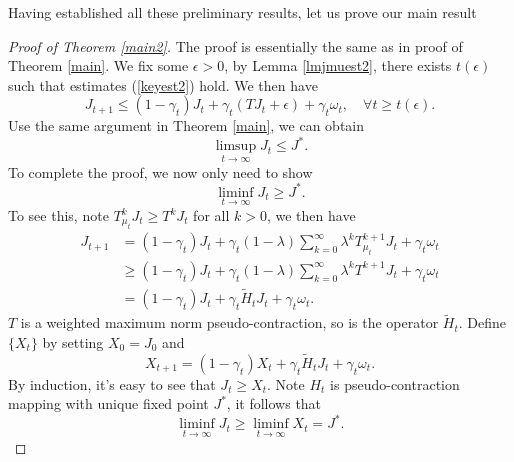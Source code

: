 \documentclass[12pt,a4paper]{amsart}
\numberwithin{equation}{section}
\theoremstyle{plain}
\theoremstyle{definition}
\begin{document}
Having established all these preliminary results, let us prove our main result 
\begin{proof}[Proof of Theorem \ref{main2}]
	The proof is essentially the same as in proof of Theorem \ref{main}. We fix some $\epsilon > 0$, by Lemma \ref{lmjmuest2}, there exists $t(\epsilon)$ such that estimates (\ref{keyest2}) hold. We then have
	$$
	J_{t+ 1} \le (1-\gamma_t)J_t + \gamma_t(TJ_t + \epsilon)  + \gamma_t \omega_t,  \quad \forall t \ge t(\epsilon).
	$$
	Use the same argument in Theorem \ref{main}, we can obtain 
	$$
	\limsup_{t  \to \infty} J_t \le J^{*}.
	$$
	To complete the proof, we now only need to show
	\begin{equation}
	\liminf_{t \to \infty} J_t \ge J^{*}.
	\end{equation}
	To see this, note $T_{\mu_t}^k J_t \ge T^k J_t$ for all $k > 0$, we then have
	$$
	\begin{aligned}
	J_{t+1} & = (1-\gamma_t) J_t + \gamma_t (1-\lambda) \sum_{k=0}^{\infty} \lambda^k T_{\mu_t}^{k+1} J_t + \gamma_t \omega_t \\
	& \ge  (1-\gamma_t) J_t + \gamma_t (1-\lambda) \sum_{k=0}^{\infty} \lambda^k T^{k+1} J_t + \gamma_t \omega_t \\
	& =  (1-\gamma_t) J_t + \gamma_t \tilde{H}_t J_t + \gamma_t \omega_t.
	\end{aligned}
	$$
	$T$ is a weighted maximum norm pseudo-contraction, so is the operator $\tilde{H}_t$. Define $\{X_t\}$ by setting $X_0 = J_0$ and
	$$
	X_{t+1}= (1-\gamma_t) X_t + \gamma_t \tilde{H}_t J_t + \gamma_t\omega_t. 
	$$
	By induction, it's easy to see that $J_t \ge X_t$. Note $H_t$ is pseudo-contraction mapping with unique fixed point $J^{*}$,  it follows that 
	$$
	\liminf_{t \to \infty} J_t \ge \liminf_{t \to \infty} X_t = J^{*}.
	$$
\end{proof}





\appendix
\raggedbottom\sloppy
\end{document}
